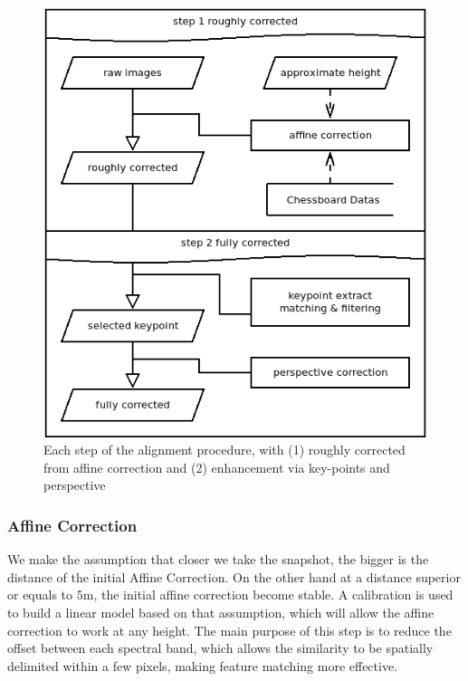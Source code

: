 \documentclass[]{elsarticle}
\begin{document}
	\begin{figure}[H]
		\centering
		\includegraphics[width=0.4\linewidth]{../figures/step.png}
		\caption{Each step of the alignment procedure, with (1) roughly corrected from affine correction and (2) enhancement via key-points and perspective}
		\label{fig:each-stages}
	\end{figure}

	
	\subsubsection{Affine Correction}
	\label{sec:affine}
	
	We make the assumption that closer we take the snapshot, the bigger is the distance of the initial Affine Correction.
	On the other hand at a distance superior or equals to $5\si{\meter}$, the initial affine correction become stable. %
	A calibration is used to build a linear model based on that assumption, which will allow the affine correction to work at any height.
	The main purpose of this step is to reduce the offset between each spectral band,
	which allows the similarity to be spatially delimited within a few pixels, making feature matching more effective.
	
\end{document}

